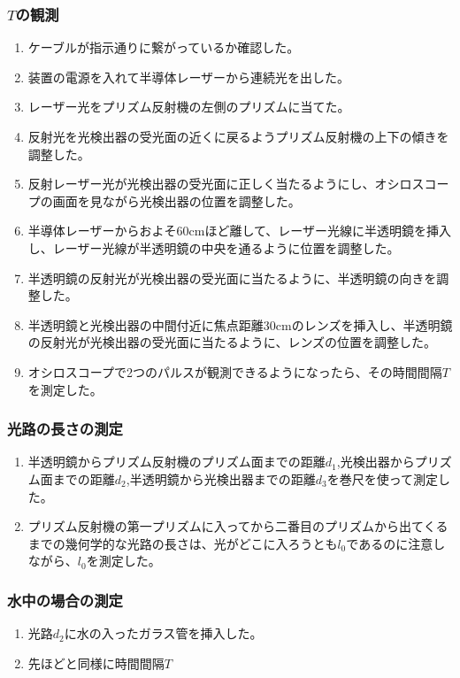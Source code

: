 \documentclass{jsarticle}
\begin{document}
\subsubsection{$T$の観測}
\begin{enumerate}
    \item ケーブルが指示通りに繋がっているか確認した。
    \item 装置の電源を入れて半導体レーザーから連続光を出した。
    \item レーザー光をプリズム反射機の左側のプリズムに当てた。
    \item 反射光を光検出器の受光面の近くに戻るようプリズム反射機の上下の傾きを調整した。
    \item 反射レーザー光が光検出器の受光面に正しく当たるようにし、オシロスコープの画面を見ながら光検出器の位置を調整した。
    \item 半導体レーザーからおよそ60cmほど離して、レーザー光線に半透明鏡を挿入し、レーザー光線が半透明鏡の中央を通るように位置を調整した。
    \item 半透明鏡の反射光が光検出器の受光面に当たるように、半透明鏡の向きを調整した。
    \item 半透明鏡と光検出器の中間付近に焦点距離30cmのレンズを挿入し、半透明鏡の反射光が光検出器の受光面に当たるように、レンズの位置を調整した。
    \item オシロスコープで2つのパルスが観測できるようになったら、その時間間隔$T$を測定した。
\end{enumerate}

\subsubsection{光路の長さの測定}
\begin{enumerate}
    \item 半透明鏡からプリズム反射機のプリズム面までの距離$d_1$,光検出器からプリズム面までの距離$d_2$,半透明鏡から光検出器までの距離$d_3$を巻尺を使って測定した。
    \item プリズム反射機の第一プリズムに入ってから二番目のプリズムから出てくるまでの幾何学的な光路の長さは、光がどこに入ろうとも$l_0$であるのに注意しながら、$l_0$を測定した。
\end{enumerate}

\subsubsection{水中の場合の測定}
\begin{enumerate}
    \item 光路$d_2$に水の入ったガラス管を挿入した。
    \item 先ほどと同様に時間間隔$T$
\end{enumerate}
\end{document}
